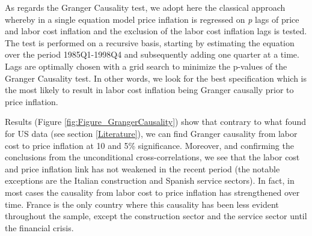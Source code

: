 \documentclass[11pt]{article}
\begin{document}
As regards the Granger Causality test, we adopt here the classical approach whereby in a single equation model price inflation is regressed on \textit{p} lags of price and labor cost inflation and the exclusion of the labor cost inflation lags is tested. The test is performed on a recursive basis, starting by estimating the equation over the period 1985Q1-1998Q4 and subsequently adding one quarter at a time. Lags are optimally chosen with a grid search to minimize the p-values of the Granger Causality test. In other words, we look for the best specification which is the most likely to result in labor cost inflation being Granger causally prior to price inflation.

Results (Figure \ref{fig:Figure_GrangerCausality}) show that contrary to what found for US data (see section \ref{Literature}), we can find  Granger causality from labor cost to price inflation at 10 and 5\% significance. Moreover, and confirming the conclusions from the unconditional cross-correlations, we see that the labor cost and price inflation link has not weakened in the recent period (the notable exceptions are the Italian construction and Spanish service sectors). In fact, in most cases the causality from labor cost to price inflation has strengthened over time. France is the only country where this causality has been less evident throughout the sample, except the construction sector and the service sector until the financial crisis.    
\end{document}
